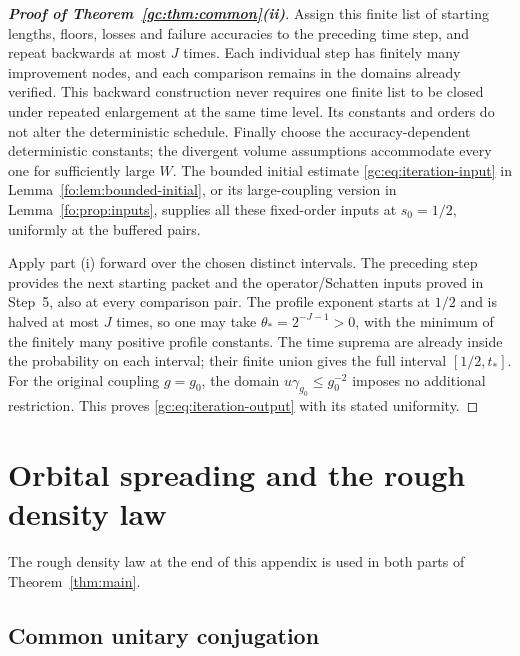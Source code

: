 \documentclass[11pt]{article}
\numberwithin{equation}{section}
\theoremstyle{remark}
\begin{document}
\begin{proof}[\textbf{Proof of Theorem~\ref{gc:thm:common}(ii)}]
Assign this finite list of starting lengths, floors, losses and failure
accuracies to the preceding time step, and repeat backwards at most
$J$ times. Each individual step has finitely many improvement nodes,
and each comparison remains in the domains already verified. This
backward construction never requires one finite list to be closed
under repeated enlargement at the same time level. Its constants and
orders do not alter the deterministic schedule. Finally choose the
accuracy-dependent deterministic constants; the divergent volume
assumptions accommodate every one for sufficiently large $W$.
The bounded initial estimate \eqref{gc:eq:iteration-input} in
Lemma~\ref{fo:lem:bounded-initial}, or its
large-coupling version in Lemma~\ref{fo:prop:inputs}, supplies all these
fixed-order inputs at $s_0=1/2$, uniformly at the buffered pairs.

Apply part (i) forward over the chosen distinct intervals. The preceding
step provides the next starting packet and the operator/Schatten inputs
proved in Step~5, also at every comparison pair. The profile exponent
starts at $1/2$ and is halved at most $J$ times, so one may take
$\theta_*=2^{-J-1}>0$, with the minimum of the finitely many positive
profile constants. The time suprema are already inside the probability
on each interval; their finite union gives the full interval
$[1/2,t_*]$. For the original coupling $g=g_0$, the domain
$u\gamma_{g_0}\le g_0^{-2}$ imposes no additional restriction.
This proves \eqref{gc:eq:iteration-output} with its stated uniformity.
\end{proof}

\section{Orbital spreading and the rough density law}
\label{sec:elementary}
The rough density law at the end of this appendix is used in both parts
of Theorem~\ref{thm:main}.

\subsection{Common unitary conjugation}\label{subsec:pf_thm31}
\end{document}
